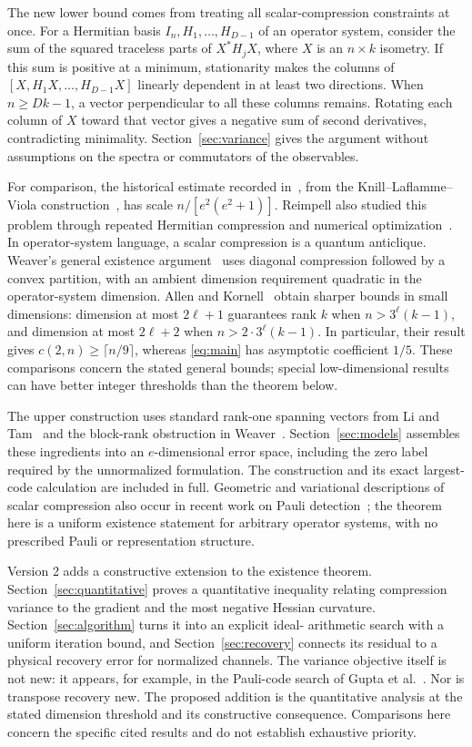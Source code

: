 \documentclass[11pt]{article}
\theoremstyle{remark}
\numberwithin{equation}{section}
\begin{document}
The new lower bound comes from treating all scalar-compression constraints
at once. For a Hermitian basis $I_n,H_1,\ldots,H_{D-1}$ of an operator
system, consider the sum of the squared traceless parts of
$X^*H_jX$, where $X$ is an $n\times k$ isometry. If this sum is positive
at a minimum, stationarity makes the columns of
$[X,H_1X,\ldots,H_{D-1}X]$ linearly dependent in at least two directions.
When $n\ge Dk-1$, a vector perpendicular to all these columns remains.
Rotating each column of $X$ toward that vector gives a negative sum of
second derivatives, contradicting minimality. Section~\ref{sec:variance}
gives the argument without assumptions on the spectra or commutators of
the observables.

For comparison, the historical estimate recorded in~\cite{KW05}, from
the Knill--Laflamme--Viola construction~\cite{KLV00}, has scale
$n/[e^2(e^2+1)]$. Reimpell also studied this problem through repeated
Hermitian compression and numerical optimization~\cite[Section~3.3.4]{Reimpell}.
In operator-system language, a scalar compression is a quantum anticlique.
Weaver's general existence argument~\cite[Theorem~2.10]{Weaver} uses
diagonal compression followed by a convex partition, with an ambient
dimension requirement quadratic in the operator-system dimension.
Allen and Kornell~\cite[Theorem~2.7]{AK} obtain sharper bounds in small
dimensions: dimension at most $2\ell+1$ guarantees rank $k$ when
$n>3^\ell(k-1)$, and dimension at most $2\ell+2$ when
$n>2\cdot3^\ell(k-1)$. In particular, their result gives
$c(2,n)\ge\lceil n/9\rceil$, whereas \eqref{eq:main} has asymptotic
coefficient $1/5$. These comparisons concern the stated general bounds;
special low-dimensional results can have better integer thresholds than
the theorem below.

The upper construction uses standard rank-one spanning vectors from
Li and Tam~\cite[Section~2.1]{LiTam} and the block-rank obstruction
in Weaver~\cite[Proposition~2.1]{Weaver}. Section~\ref{sec:models}
assembles these ingredients into an $e$-dimensional error space, including
the zero label required by the unnormalized formulation. The construction
and its exact largest-code calculation are included in full. Geometric
and variational descriptions of scalar compression also occur in recent
work on Pauli detection~\cite{Gupta,Sun}; the theorem here is a uniform
existence statement for arbitrary operator systems, with no prescribed
Pauli or representation structure.

Version 2 adds a constructive extension to the existence theorem.
Section~\ref{sec:quantitative} proves a quantitative inequality relating
compression variance to the gradient and the most negative Hessian
curvature. Section~\ref{sec:algorithm} turns it into an explicit ideal-
arithmetic search with a uniform iteration bound, and
Section~\ref{sec:recovery} connects its residual to a physical recovery
error for normalized channels. The variance objective itself is not new:
it appears, for example, in the Pauli-code search of
Gupta et al.~\cite[Section~VI.1]{Gupta}. Nor is transpose recovery new.
The proposed addition is the quantitative analysis at the stated dimension
threshold and its constructive consequence. Comparisons here concern the
specific cited results and do not establish exhaustive priority.
\end{document}
